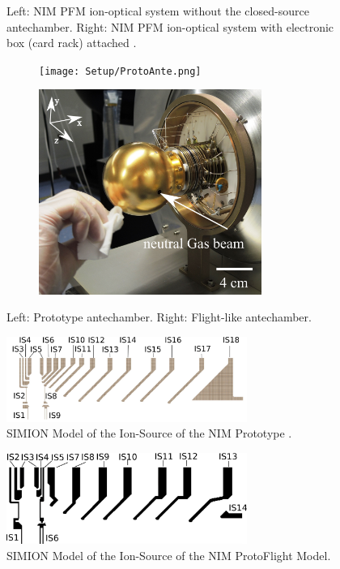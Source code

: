 \begin{figure}[h]
\begin{subfigure}{0.5\textwidth}
		\end{subfigure}
		\caption{Left: NIM PFM ion-optical system without the closed-source antechamber. Right: NIM PFM ion-optical system with electronic box (card rack) attached \cite{Foehn2021}.}
		\label{fig:SetupPFM}
	\end{figure}
	\begin{figure}[h!] %
		\begin{subfigure}{0.5\textwidth}
			\centering
			\texttt{[image: Setup/ProtoAnte.png]}
		\end{subfigure}
		\begin{subfigure}{0.5\textwidth}
			\centering
			\includegraphics[width = 0.8\textwidth]{Setup/FlightAnte.png}
		\end{subfigure}
		\caption{Left: Prototype antechamber. Right: Flight-like antechamber.}
		\label{fig:SetupAntecham}
	\end{figure}
	\begin{figure}[h] %
		\centering
		\includegraphics[width= 0.7\textwidth]{Setup/Proto_IS_sim.png}
		\caption{SIMION Model of the Ion-Source of the NIM Prototype \cite{Diss_Meyer}.}
		\label{fig:SetupProtoISSim}
	\end{figure}
	\begin{figure}[h] %
		\centering
		\includegraphics[width=0.7\textwidth]{Setup/ISFlight_bearb.png}
		\caption{SIMION Model of the Ion-Source of the NIM ProtoFlight Model.}
		\label{fig:SetupPFMISSim}
	\end{figure}
